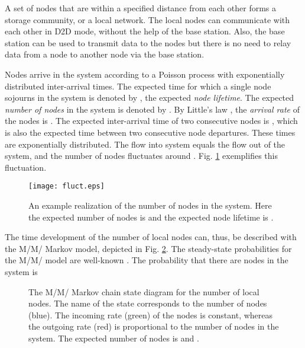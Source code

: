 \documentclass[10pt,conference]{IEEEtran}
\begin{document}
A set of nodes that are within a specified distance from each other
forms a storage community, or a local network. The local nodes can
communicate with each other in D2D mode, without the help of the
base station. Also, the base station can be used to transmit data to
the nodes but there is no need to relay data from a node to another
node via the base station.

Nodes arrive in the system according to a Poisson process with
exponentially distributed inter-arrival times. The expected time for
which a single node sojourns in the system is denoted by , the
expected \emph{node lifetime}. The expected \emph{number of nodes} in
the system is denoted by . By Little's law \cite{little}, the
\emph{arrival rate} of the nodes is . The expected
inter-arrival time of two consecutive nodes is , which is also the
expected time between two consecutive node departures. These times are
exponentially distributed. The flow into system equals the flow out of
the system, and the number of nodes fluctuates around . Fig. \ref{fluct} exemplifies this fluctuation.
\begin{figure}[tb]
\centering \texttt{[image: fluct.eps]}
\caption{An example realization of the number of nodes in the system. Here the expected number of nodes is  and the expected node lifetime is .}
\label{fluct}
\end{figure}

The time development of the number of local nodes can, thus, be
described with the M/M/ Markov model, depicted in Fig.
\ref{mchain}. The steady-state probabilities for the M/M/
model are well-known \cite{harrison}. The probability that there are
 nodes in the system is


\begin{figure}[b]
\begin{center}
\end{center}
\caption{The M/M/ Markov chain state diagram for the number of local nodes. The name of the state corresponds to the number of nodes (blue). The incoming rate (green) of the nodes is constant, whereas the outgoing rate (red) is proportional to the number of nodes in the system. The expected number of nodes is  and .}
\label{mchain}
\end{figure}
\end{document}
